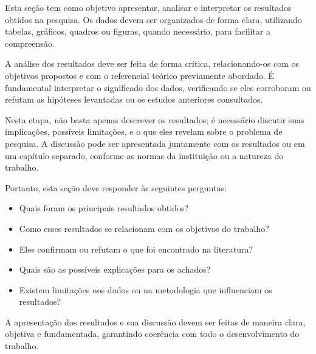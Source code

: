 
Esta seção tem como objetivo apresentar, analisar e interpretar os resultados obtidos na pesquisa. Os dados devem ser organizados de forma clara, utilizando tabelas, gráficos, quadros ou figuras, quando necessário, para facilitar a compreensão.

A análise dos resultados deve ser feita de forma crítica, relacionando-os com os objetivos propostos e com o referencial teórico previamente abordado. É fundamental interpretar o significado dos dados, verificando se eles corroboram ou refutam as hipóteses levantadas ou os estudos anteriores consultados.

Nesta etapa, não basta apenas descrever os resultados; é necessário discutir suas implicações, possíveis limitações, e o que eles revelam sobre o problema de pesquisa. A discussão pode ser apresentada juntamente com os resultados ou em um capítulo separado, conforme as normas da instituição ou a natureza do trabalho.

Portanto, esta seção deve responder às seguintes perguntas:

\begin{itemize}
    \item Quais foram os principais resultados obtidos?
    \item Como esses resultados se relacionam com os objetivos do trabalho?
    \item Eles confirmam ou refutam o que foi encontrado na literatura?
    \item Quais são as possíveis explicações para os achados?
    \item Existem limitações nos dados ou na metodologia que influenciam os resultados?
\end{itemize}

A apresentação dos resultados e sua discussão devem ser feitas de maneira clara, objetiva e fundamentada, garantindo coerência com todo o desenvolvimento do trabalho.